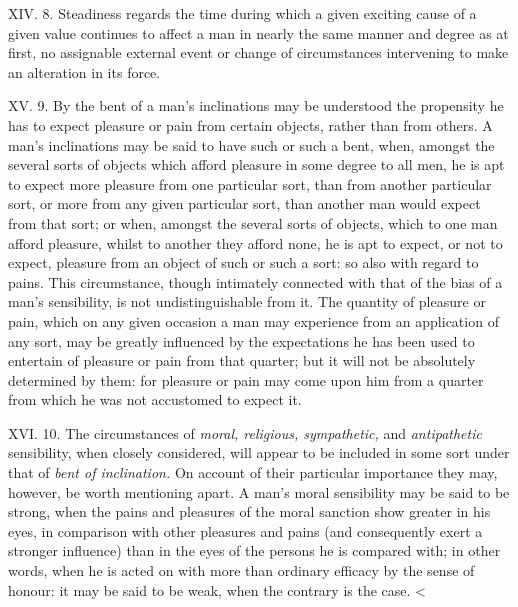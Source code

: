 \documentclass[12pt]{report}
\begin{document}
XIV. 8. Steadiness regards the time during which a given exciting cause
of a given value continues to affect a man in nearly the same manner and
degree as at first, no assignable external event or change of
circumstances intervening to make an alteration in its force.

XV. 9. By the bent of a man's inclinations may be understood the
propensity he has to expect pleasure or pain from certain objects,
rather than from others. A man's inclinations may be said to have such
or such a bent, when, amongst the several sorts of objects which afford
pleasure in some degree to all men, he is apt to expect more pleasure
from one particular sort, than from another particular sort, or more
from any given particular sort, than another man would expect from that
sort; or when, amongst the several sorts of objects, which to one man
afford pleasure, whilst to another they afford none, he is apt to
expect, or not to expect, pleasure from an object of such or such a
sort: so also with regard to pains. This circumstance, though intimately
connected with that of the bias of a man's sensibility, is not
undistinguishable from it. The quantity of pleasure or pain, which on
any given occasion a man may experience from an application of any sort,
may be greatly influenced by the expectations he has been used to
entertain of pleasure or pain from that quarter; but it will not be
absolutely determined by them: for pleasure or pain may come upon him
from a quarter from which he was not accustomed to expect it.

XVI. 10. The circumstances of \emph{moral, religious, sympathetic,} and
\emph{antipathetic} sensibility, when closely considered, will appear to
be included in some sort under that of \emph{bent of inclination.} On
account of their particular importance they may, however, be worth
mentioning apart. A man's moral sensibility may be said to be strong,
when the pains and pleasures of the moral sanction show greater in his
eyes, in comparison with other pleasures and pains (and consequently
exert a stronger influence) than in the eyes of the persons he is
compared with; in other words, when he is acted on with more than
ordinary efficacy by the sense of honour: it may be said to be weak,
when the contrary is the case. \textless{}
\end{document}
